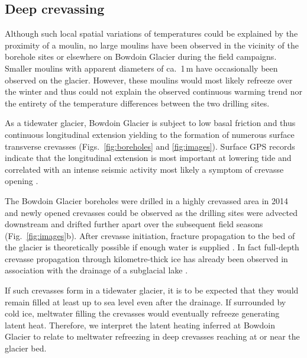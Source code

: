\documentclass[utf8]{article}
\begin{document}
\subsection{Deep crevassing}

    Although such local spatial variations of temperatures could be explained by the
    proximity of a moulin, no large moulins have been observed in the vicinity
    of the borehole sites or elsewhere on Bowdoin Glacier during the field
    campaigns. Smaller moulins with apparent diameters of ca.~1\,m have
    occasionally been observed on the glacier. However, these moulins would
    most likely refreeze over the winter and thus could not explain the
    observed continuous warming trend nor the entirety of the temperature
    differences between the two drilling sites.

    As a tidewater glacier, Bowdoin Glacier is subject to low basal friction
    \citep{Seddik.etal.2019} and
    thus continuous longitudinal extension yielding to the formation of
    numerous surface transverse crevasses (Figs.~\ref{fig:boreholes} and
    \ref{fig:images}). Surface GPS records indicate that the longitudinal
    extension is most important at lowering tide and correlated with an intense
    seismic activity most likely a symptom of crevasse opening
    \citep{Podolskiy.etal.2016, Podolskiy.etal.2017}.

    The Bowdoin Glacier boreholes were drilled in a highly crevassed area in
    2014 and newly opened crevasses could be observed as the drilling sites
    were
    advected downstream and drifted further apart over the subsequent field
    seasons (Fig.~\ref{fig:images}b). After crevasse initiation, fracture
    propagation to the bed of the glacier is theoretically possible if enough
    water is supplied \citep{Veen.2007}. In fact full-depth crevasse
    propagation through kilometre-thick ice has already been observed in
    association with the drainage of a subglacial lake \citep{Das.etal.2008}.

    If such crevasses form in a tidewater glacier, it is to be expected that
    they would remain filled at least up to sea level even after the drainage.
    If surrounded by cold ice, meltwater filling the crevasses would eventually
    refreeze generating latent heat. Therefore, we interpret the latent heating
    inferred at Bowdoin Glacier to relate to meltwater refreezing in deep
    crevasses reaching at or near the glacier bed.
\end{document}
